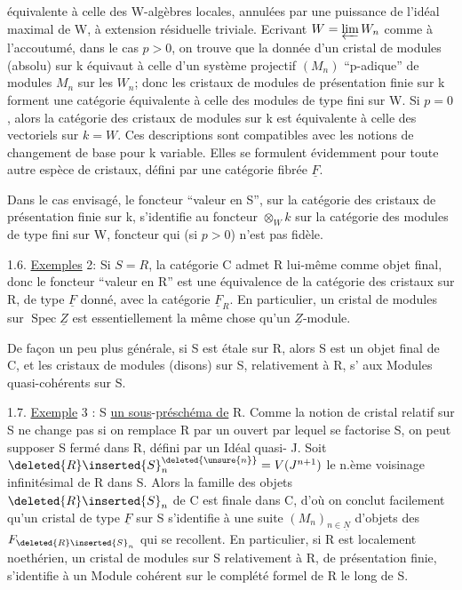 
 équivalente à celle des W-algèbres locales, annulées par une puissance de l'idéal maximal de W, à extension résiduelle triviale. Ecrivant $W=\varprojlim W_n$ comme à l'accoutumé, dans le cas $p>0$, on trouve que la donnée d'un cristal de modules (absolu) sur k équivaut à celle d'un système projectif $(M_n)$ ``p-adique'' de modules $M_n$ sur les $W_n$; donc les cristaux de modules de présentation finie sur k forment une catégorie équivalente à celle des modules de type fini sur W. Si $p=0$, alors la catégorie des cristaux de modules sur k est équivalente à celle des  vectoriels sur $k=W$. Ces descriptions sont compatibles avec les notions de changement de base pour k variable. Elles se formulent évidemment pour toute autre espèce de cristaux, défini par une catégorie fibrée $\underline F$.

Dans le cas envisagé, le foncteur\deleted{\unsure{:}} ``valeur en S'', sur la catégorie des cristaux de présentation finie sur k, s'identifie au foncteur $\otimes_Wk$ sur la catégorie des modules de type fini sur W, foncteur qui (si $p>0$) n'est pas fidèle.

1.6. \uline{Exemples} 2:  Si $S=R$, la catégorie C admet R lui-même comme objet final, donc le foncteur ``valeur en R'' est une équivalence de la catégorie des cristaux sur R, de type $\underline F$ donné, avec la catégorie $\underline F_R$. En particulier, un cristal de modules sur $\operatorname{Spec}\underline Z$ est essentiellement la même chose qu'un $\underline Z$-module.

De façon un peu plus générale, si S est étale sur R, alors S est un objet final de C, et les cristaux de modules (disons) sur S, relativement à R, s' aux Modules quasi-cohérents sur S.

1.7.  \uline{Exemple} 3 : S \uline{un sous}-\uline{préschéma de} R. Comme la notion de cristal relatif sur S ne change pas si on remplace R par un ouvert par lequel se factorise S, on peut supposer S fermé dans R, défini par un Idéal quasi- J. Soit $\deleted{R}\inserted{S}_n^{\deleted{\unsure{n}}}=V(J^{n+1})$ le n.ème voisinage infinitésimal de R dans S. Alors la famille des objets $\deleted{R}\inserted{S}_n$ de C est finale dans C, d'où on conclut facilement qu'un cristal de type $\underline F$ sur S s'identifie à une suite $(M_n)_{n\in\underline N}$ d'objets des $F_{\deleted{R}\inserted{S}_n}$ qui se recollent. En particulier, si R est localement noethérien, un cristal de modules sur S relativement à R, de présentation finie, s'identifie à un Module cohérent sur le complété formel de R le long de S.
